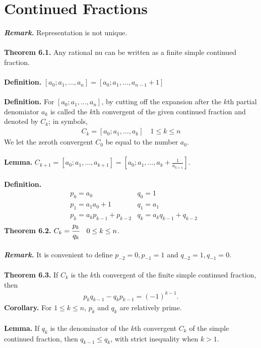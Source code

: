 \documentclass[a4paper,10pt]{article}
\begin{document}
\section{Continued Fractions}
\textit{\textbf{Remark.}} Representation is not unique. \\ \\
\textbf{Theorem 6.1.} Any rational nu can be written as a finite simple continued fraction. \\ \\
\textbf{Definition.} \; $[a_{0};a_{1},\ldots,a_{n}]=[a_{0};a_{1},\ldots,a_{n-1}+1]$ \\ \\
\textbf{Definition.} For $[a_{0};a_{1},\ldots,a_{n}]$, by cutting off the expansion after the $k$th partial denomiator $a_{k}$ is called the $k$th convergent of the given continued fraction and denoted by $C_{k}$; in symbols,
\begin{align}
C_{k}=[a_{0};a_{1},\ldots,a_{k}] \quad 1\leq k \leq n
\end{align}
We let the zeroth convergent $C_{0}$ be equal to the number $a_{0}$. \\ \\
\textbf{Lemma.} $C_{k+1}=[a_{0};a_{1},\ldots,a_{k+1}]=[a_{0};a_{1},\ldots,a_{k}+\frac{1}{a_{k+1}}]$. \\ \\
\textbf{Definition.}
\begin{align}
&	p_{0}=a_{0} & q_{0}=1 \\
&	p_{1}=a_{1}a_{0}+1 & q_{1}=a_{1} \\
&	p_{k}=a_{k}p_{k-1}+p_{k-2} & q_{k}=a_{k}q_{k-1}+q_{k-2}
\end{align}
\textbf{Theorem 6.2.} $C_{k}=\cfrac{p_{k}}{q_{k}} \quad 0\leq k \leq n$. \\ \\
\textit{\textbf{Remark.}} It is convenient to define $p_{-2}=0,p_{-1}=1$ \quad and \quad $q_{-2}=1,q_{-1}=0$. \\ \\
\textbf{Theorem 6.3.} If $C_{k}$ is the $k$th convergent of the finite simple continued fraction, then 
\begin{align}
p_{k}q_{k-1}-q_{k}p_{k-1}=(-1)^{k-1}.
\end{align}
\textbf{Corollary.} For $1\leq k\leq n$, $p_{k}$ and $q_{k}$ are relatively prime. \\ \\
\textbf{Lemma.} If $q_{k}$ is the denominator of the $k$th convergent $C_{k}$ of the simple continued fraction, then $q_{k-1}\leq q_{k}$, with strict inequality when $k>1$. \\ \\
\end{document}
